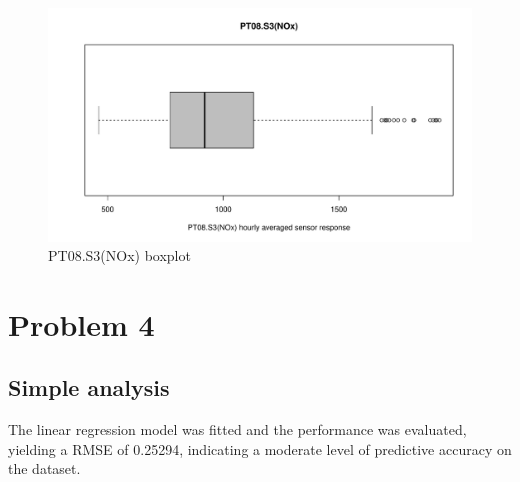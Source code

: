 \documentclass{article}
\begin{document}
\begin{figure}[H]
   \centering
   \includegraphics[width=\linewidth]{images/5_r.pdf}
   \caption{PT08.S3(NOx) boxplot}
   \label{fig:fig16}
\end{figure}
\newpage
\section{Problem 4}
\subsection{Simple analysis}
The linear regression model was fitted and the performance was evaluated, yielding a RMSE of 0.25294, indicating a moderate level of predictive accuracy on the dataset.
\end{document}
